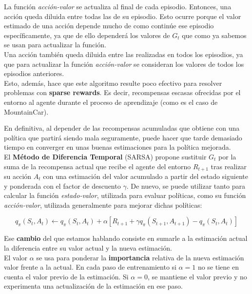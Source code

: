 \documentclass[11pt,fleqn]{book} %
\begin{document}
La función \textit{acción-valor} se actualiza al final de cada episodio. Entonces, una acción queda diluida entre todas las de su episodio. Esto ocurre porque el valor estimado de una acción depende mucho de como continúe ese episodio específicamente, ya que de ello dependerá los valores de $G_t$ que como ya sabemos se usan para actualizar la función. \\

Una acción también queda diluida entre las realizadas en todos los episodios, ya que para actualizar la función \textit{acción-valor} se consideran los valores de todos los episodios anteriores. \\

Esto, además, hace que este algoritmo resulte poco efectivo para resolver problemas con \textbf{sparse rewards}. Es decir, recompensas escasas ofrecidas por el entorno al agente durante el proceso de aprendizaje (como es el caso de MountainCar). \cite{article:sparse}

En definitiva, al depender de las recompensas acumuladas que obtiene con una política que partirá siendo mala seguramente, puede hacer que tarde demasiado tiempo en converger en unas buenas estimaciones para la política mejorada. \\

El \textbf{Método de Diferencia Temporal} (SARSA) \cite{book:miguel} \cite{article:RLromero} propone sustituir $G_{t}$ por la suma de la recompensa actual que recibe el agente del entorno $R_{t+1}$ tras realizar su acción $A_t$ con una estimación del valor acumulado a partir del estado siguiente y ponderada con el factor de descuento $\gamma$. De nuevo, se puede utilizar tanto para calcular la función \textit{estado-valor}, utilizada para evaluar políticas, como su función \textit{acción-valor}, utilizada generalmente para mejorar dichas políticas:

\begin{equation}
q_\pi(S_t,A_t) \leftarrow q_\pi(S_t,A_t)+\alpha\left[R_{t+1}+\gamma q_\pi(S_{t+1},A_{t+1}) - q_\pi(S_t,A_t)\right]
\end{equation}

Ese \textbf{cambio} del que estamos hablando consiste en sumarle a la estimación actual la diferencia entre su valor actual y la nueva estimación.\\

El valor $\alpha$ se usa para ponderar la \textbf{importancia} relativa de la nueva estimación valor frente a la actual. En cada paso de entrenamiento si $\alpha=1$ no se tiene en cuenta el valor previo de la estimación. Si $\alpha=0$, se mantiene el valor previo y no experimenta una actualización de la estimación en ese paso.\\
\end{document}
